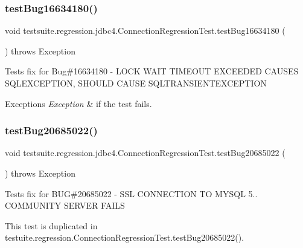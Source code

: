 \subsubsection{\texorpdfstring{test\+Bug16634180()}{testBug16634180()}}
{\footnotesize\ttfamily void testsuite.\+regression.\+jdbc4.\+Connection\+Regression\+Test.\+test\+Bug16634180 (\begin{DoxyParamCaption}{ }\end{DoxyParamCaption}) throws Exception}

Tests fix for Bug\#16634180 -\/ L\+O\+CK W\+A\+IT T\+I\+M\+E\+O\+UT E\+X\+C\+E\+E\+D\+ED C\+A\+U\+S\+ES S\+Q\+L\+E\+X\+C\+E\+P\+T\+I\+ON, S\+H\+O\+U\+LD C\+A\+U\+SE S\+Q\+L\+T\+R\+A\+N\+S\+I\+E\+N\+T\+E\+X\+C\+E\+P\+T\+I\+ON


\begin{DoxyExceptions}{Exceptions}
{\em Exception} & if the test fails. \\
\hline
\end{DoxyExceptions}
\mbox{\label{classtestsuite_1_1regression_1_1jdbc4_1_1_connection_regression_test_a22495738619bc4a10ae5064345a6cf67}} 
\subsubsection{\texorpdfstring{test\+Bug20685022()}{testBug20685022()}}
{\footnotesize\ttfamily void testsuite.\+regression.\+jdbc4.\+Connection\+Regression\+Test.\+test\+Bug20685022 (\begin{DoxyParamCaption}{ }\end{DoxyParamCaption}) throws Exception}

Tests fix for B\+UG\#20685022 -\/ S\+SL C\+O\+N\+N\+E\+C\+T\+I\+ON TO M\+Y\+S\+QL 5.. C\+O\+M\+M\+U\+N\+I\+TY S\+E\+R\+V\+ER F\+A\+I\+LS

This test is duplicated in testuite.\+regression.\+Connection\+Regression\+Test.\+test\+Bug20685022().


